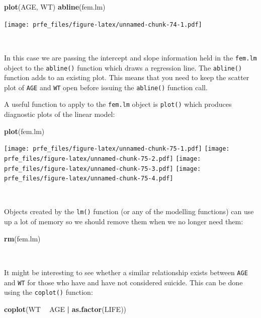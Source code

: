 \documentclass[12pt,a4paper]{book}
\newenvironment{Shaded}{\begin{snugshade}}{\end{snugshade}}
\newcommand{\KeywordTok}[1]{\textcolor[rgb]{0.13,0.29,0.53}{\textbf{#1}}}
\newcommand{\StringTok}[1]{\textcolor[rgb]{0.31,0.60,0.02}{#1}}
\newcommand{\OperatorTok}[1]{\textcolor[rgb]{0.81,0.36,0.00}{\textbf{#1}}}
\newcommand{\NormalTok}[1]{#1}
\theoremstyle{definition}
\theoremstyle{definition}
\theoremstyle{definition}
\theoremstyle{remark}
\begin{document}
\begin{Shaded}
\begin{Highlighting}[]
\KeywordTok{plot}\NormalTok{(AGE, WT)}
\KeywordTok{abline}\NormalTok{(fem.lm)}
\end{Highlighting}
\end{Shaded}

\texttt{[image: prfe\_files/figure-latex/unnamed-chunk-74-1.pdf]}

~

In this case we are passing the intercept and slope information held in
the \texttt{fem.lm} object to the \texttt{abline()} function which draws
a regression line. The \texttt{abline()} function adds to an existing
plot. This means that you need to keep the scatter plot of \texttt{AGE}
and \texttt{WT} open before issuing the \texttt{abline()} function call.

A useful function to apply to the \texttt{fem.lm} object is
\texttt{plot()} which produces diagnostic plots of the linear model:

\begin{Shaded}
\begin{Highlighting}[]
\KeywordTok{plot}\NormalTok{(fem.lm)}
\end{Highlighting}
\end{Shaded}

\texttt{[image: prfe\_files/figure-latex/unnamed-chunk-75-1.pdf]}
\texttt{[image: prfe\_files/figure-latex/unnamed-chunk-75-2.pdf]}
\texttt{[image: prfe\_files/figure-latex/unnamed-chunk-75-3.pdf]}
\texttt{[image: prfe\_files/figure-latex/unnamed-chunk-75-4.pdf]}

~

Objects created by the \texttt{lm()} function (or any of the modelling
functions) can use up a lot of memory so we should remove them when we
no longer need them:

\begin{Shaded}
\begin{Highlighting}[]
\KeywordTok{rm}\NormalTok{(fem.lm)}
\end{Highlighting}
\end{Shaded}

~

It might be interesting to see whether a similar relationship exists
between \texttt{AGE} and \texttt{WT} for those who have and have not
considered suicide. This can be done using the \texttt{coplot()}
function:

\begin{Shaded}
\begin{Highlighting}[]
\KeywordTok{coplot}\NormalTok{(WT }\OperatorTok{~}\StringTok{ }\NormalTok{AGE }\OperatorTok{|}\StringTok{ }\KeywordTok{as.factor}\NormalTok{(LIFE))}
\end{Highlighting}
\end{Shaded}
\end{document}
